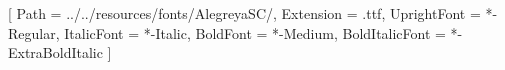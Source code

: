 \begin{titlingpage}%

    [
        Path           = ../../resources/fonts/AlegreyaSC/,
        Extension      = .ttf,
        UprightFont    = *-Regular,
        ItalicFont     = *-Italic,
        BoldFont       = *-Medium,
        BoldItalicFont = *-ExtraBoldItalic
    ]
\end{titlingpage}
